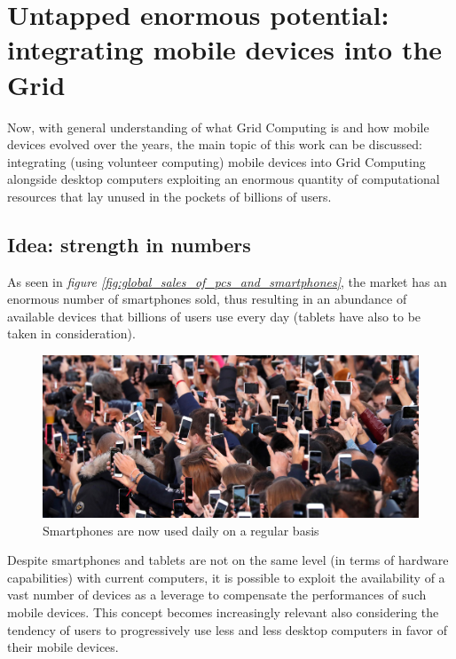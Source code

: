\section{Untapped enormous potential: integrating mobile devices into the Grid}
Now, with general understanding of what Grid Computing is and how mobile devices evolved over the years, the main topic of this work can be discussed: integrating (using volunteer computing) mobile devices into Grid Computing alongside desktop computers exploiting an enormous quantity of computational resources that lay unused in the pockets of billions of users.

\subsection{Idea: strength in numbers}
As seen in \textit{figure \ref{fig:global_sales_of_pcs_and_smartphones}}, the market has an enormous number of smartphones sold, thus resulting in an abundance of available devices that billions of users use every day (tablets have also to be taken in consideration).
\vspace{10mm}

\begin{figure}[!ht]
    \centering
    \includegraphics[scale=1.2]{document/chapters/chapter_1/images/people_using_smartphones.jpg}
    \caption{Smartphones are now used daily on a regular basis}
    \label{fig:people_using_smartphones}
\end{figure}

Despite smartphones and tablets are not on the same level (in terms of hardware capabilities) with current computers, it is possible to exploit the availability of a vast number of devices as a leverage to compensate the performances of such mobile devices.
This concept becomes increasingly relevant also considering the tendency of users to progressively use less and less desktop computers in favor of their mobile devices.

